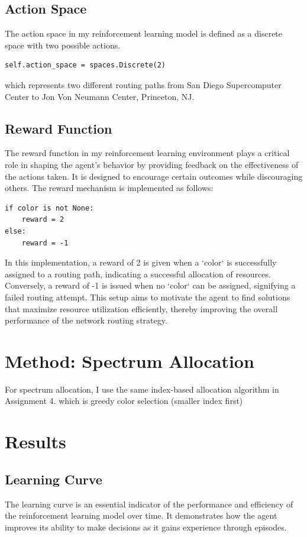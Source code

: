 \documentclass[conference]{IEEEtran}
\begin{document}
\subsection{Action Space}
The action space in my reinforcement learning model is defined as a discrete space with two possible actions. 
\begin{verbatim}
self.action_space = spaces.Discrete(2)
\end{verbatim}
which represents two different routing paths from San Diego Supercomputer Center to Jon Von Neumann Center, Princeton, NJ.
\subsection{Reward Function}
The reward function in my reinforcement learning environment plays a critical role in shaping the agent's behavior by providing feedback on the effectiveness of the actions taken. It is designed to encourage certain outcomes while discouraging others. The reward mechanism is implemented as follows:
\begin{verbatim}
if color is not None:
    reward = 2   
else:
    reward = -1
\end{verbatim}
In this implementation, a reward of 2 is given when a `color` is successfully assigned to a routing path, indicating a successful allocation of resources. Conversely, a reward of -1 is issued when no `color` can be assigned, signifying a failed routing attempt. This setup aims to motivate the agent to find solutions that maximize resource utilization efficiently, thereby improving the overall performance of the network routing strategy.

\section{Method: Spectrum Allocation}
For spectrum allocation, I use the same index-based allocation algorithm in Assignment 4. which is greedy color selection (smaller index first)



\section{Results}
\subsection{Learning Curve}
The learning curve is an essential indicator of the performance and efficiency of the reinforcement learning model over time. It demonstrates how the agent improves its ability to make decisions as it gains experience through episodes. 
\end{document}
